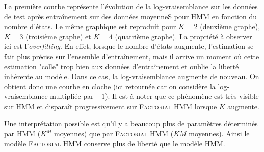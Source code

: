 \documentclass[10pt,a4paper]{article}
\newcommand{\hmm}{\textsc{HMM}}
\newcommand{\fhmm}{\textsc{Factorial HMM}}
\begin{document}
La première courbe représente l'évolution de la log-vraisemblance sur les
données de test après entraînement sur des données moyenneS pour \hmm{} en
fonction du nombre d'états.
Le même graphique est reproduit pour $K=2$ (deuxième graphe), $K=3$ (troisième
graphe) et $K=4$ (quatrième graphe).
La propriété à observer ici est l'\emph{overfitting}. En effet, lorsque le
nombre d'états augmente, l'estimation se fait plus précise sur l'ensemble
d'entraînement, mais il arrive un moment où cette estimation "colle" trop bien
aux données d'entraînement et oublie la liberté inhérente au modèle.
Dans ce cas, la log-vraisemblance augmente de nouveau.
On obtient donc une courbe en cloche (ici retournée car on considère la
log-vraisemblance multipliée par $-1$).
Il est à noter que ce phénomène est très visible sur \hmm{} et disparaît
progressivement sur \fhmm{} lorsque $K$ augmente. 

Une interprétation possible est qu'il y a beaucoup plus de paramètres
déterminés par \hmm{} ($K^M$ moyennes) que par \fhmm{} ($KM$ moyennes).
Ainsi le modèle \fhmm{} conserve plus de liberté que le modèle \hmm{}.
\end{document}

